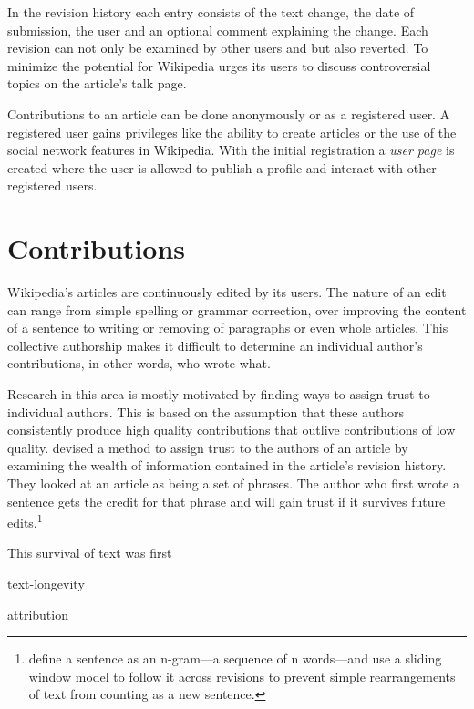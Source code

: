 In the revision history each entry consists of the text change, the date of submission, the user and an optional comment explaining the change.
Each revision can not only be examined by other users and but also reverted.
To minimize the potential for \cite{suh2007us} Wikipedia urges its users to discuss controversial topics on the article's talk page.


Contributions to an article can be done anonymously or as a registered user.
A registered user gains privileges like the ability to create articles or the use of the social network features in Wikipedia.
With the initial registration a \emph{user page} is created where the user is allowed to publish a profile and interact with other registered users.\cite{wikiwhyaccount}


\section{Contributions}\label{sec:contribution}

Wikipedia's articles are continuously edited by its users.
The nature of an edit can range from simple spelling or grammar correction, over improving the content of a sentence to writing or removing of paragraphs or even whole articles. 
This collective authorship makes it difficult to determine an individual author's contributions, in other words, who wrote what.

Research in this area is mostly motivated by finding ways to assign trust to individual authors.
This is based on the assumption that these authors consistently produce high quality contributions that outlive contributions of low quality.
\textcite{kramer2008wiki} devised a method to assign trust to the authors of an article by examining the wealth of information contained in the article's revision history.
They looked at an article as being a set of phrases.
The author who first wrote a sentence gets the credit for that phrase and will gain trust if it survives future edits.\footnote{\textcite{kramer2008wiki} define a sentence as an n-gram---a sequence of n words---and use a sliding window model to follow it across revisions to prevent simple rearrangements of text from counting as a new sentence.}

This survival of text was first 
\begin{todos}
    \item text-longevity
    \item attribution
\end{todos}

